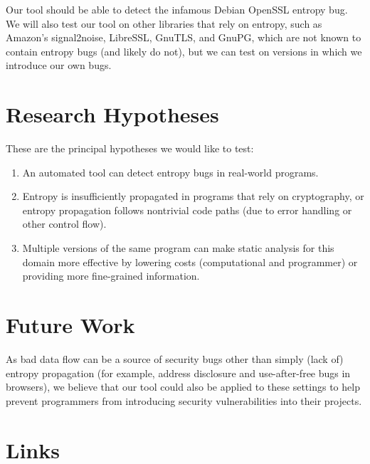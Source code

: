 \documentclass[letterpaper,twocolumn,10pt]{article}
\begin{document}
Our tool should be able to detect the infamous Debian OpenSSL entropy bug. We will also test our tool on other libraries that rely on entropy, such as Amazon's signal2noise, LibreSSL, GnuTLS, and GnuPG,
which are not known to contain entropy bugs (and likely do not), but we can test on versions in which we introduce our own bugs.

\section{Research Hypotheses}

These are the principal hypotheses we would like to test:

\begin{enumerate}
	\item An automated tool can detect entropy bugs in real-world programs.
	\item Entropy is insufficiently propagated in programs that rely on cryptography, or entropy propagation follows nontrivial code paths (due to error handling or other control flow).
	\item Multiple versions of the same program can make static analysis for this domain more effective by lowering costs (computational and programmer) or providing more fine-grained information.
\end{enumerate}

\section{Future Work}

As bad data flow can be a source of security bugs other than simply (lack of) entropy propagation (for example, 
address disclosure and use-after-free bugs in browsers), we believe that our tool could also be applied to these settings to help prevent
programmers from introducing security vulnerabilities into their projects.

\section{Links}
\end{document}
